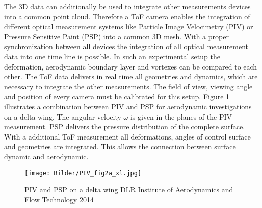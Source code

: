 The 3D data can additionally be used to integrate other measurements devices into a common point cloud. Therefore a ToF camera enables the integration of different optical measurement systems like Particle Image Velocimetry (PIV) or Pressure Sensitive Paint (PSP) into a common 3D mesh. With a proper synchronization between all devices the integration of all optical measurement data into one time line is possible. In such an experimental setup the deformation, aerodynamic boundary layer and vortexes can be compared to each other. The ToF data delivers in real time all geometries and dynamics, which are necessary to integrate the other measurements. The field of view, viewing angle and position of every camera must be calibrated for this setup. Figure \ref{fig:PIV_fig2a_xl.jpg} illustrates a combination between PIV and PSP for aerodynamic investigations on a delta wing. The angular velocity $\omega$ is given in the planes of the PIV measurement. PSP delivers the pressure distribution of the complete surface.  With a additional ToF measurement all deformations, angles of control surface and geometries are integrated. This allows the connection between surface dynamic and aerodynamic.
\medskip

\begin{figure}[!h]  
	\centering
	\texttt{[image: Bilder/PIV\_fig2a\_xl.jpg]}
	\caption{PIV and PSP on a delta wing \tiny DLR
		Institute of Aerodynamics and Flow Technology 2014}
	\label{fig:PIV_fig2a_xl.jpg}
\end{figure}  
